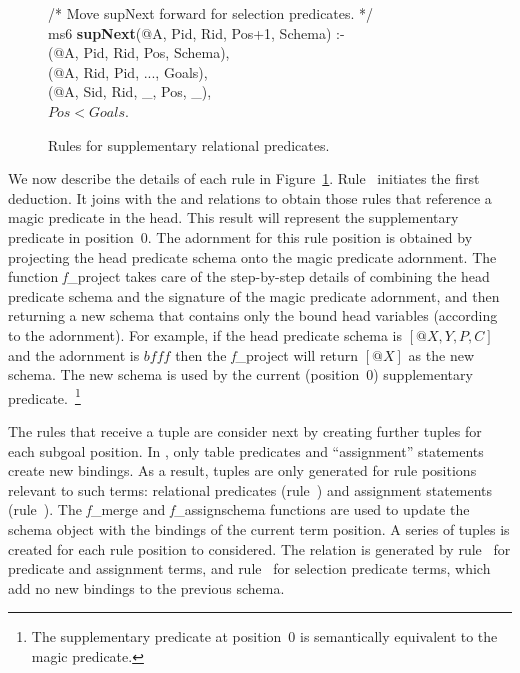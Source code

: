 \begin{figure}[!t]
\begin{boxedminipage}{\linewidth}
/* Move supNext forward for selection predicates. */ \\
ms6 {\bf supNext}(@A, Pid, Rid, Pos+1, Schema) :- \\
(@A, Pid, Rid, Pos, Schema), \\
(@A, Rid, Pid, ..., Goals), \\
(@A, Sid, Rid, \_, Pos, \_), \\
\datalogspace $Pos < Goals$. 
\end{boxedminipage}
\caption{\label{ch:magic:fig:magic2}Rules for supplementary relational predicates.}
\end{figure}

We now describe the details of each rule in Figure~\ref{ch:magic:fig:magic2}.
Rule~ initiates the first  deduction.  It joins 
with the  and  relations to obtain those rules that
reference a magic predicate in the head.  This result will represent the
supplementary predicate in position~$0$.  The adornment for this rule position
is obtained by projecting the head predicate schema onto the magic predicate
adornment.  The function {\emph f\_project} takes care of the step-by-step
details of combining the head predicate schema and the signature of the magic
predicate adornment, and then returning a new schema that contains only the bound
head variables (according to the adornment).  For example, if the head
predicate schema is $[@X, Y, P, C]$ and the adornment is $bfff$ then the {\emph
f\_project} will return $[@X]$ as the new schema.  The new schema is used by
the current (position~$0$) supplementary predicate.~\footnote{The supplementary
predicate at position~$0$ is semantically equivalent to the magic predicate.}

The rules that receive a  tuple are consider next by creating further
 tuples for each subgoal position.  In \OVERLOG, only table predicates
and ``assignment'' statements create new bindings.  As a result, 
tuples are only generated for rule positions relevant to such terms: relational
predicates (rule~) and assignment statements (rule~).  The
{\emph f\_merge} and {\emph f\_assignschema} functions are used to update the
schema object with the bindings of the current term position.  A series of
 tuples is created for each rule position to considered.  The
 relation is generated by rule~ for predicate and
assignment terms, and rule~ for selection predicate terms, which add no
new bindings to the previous schema.


